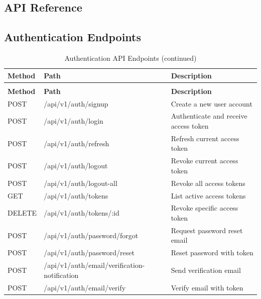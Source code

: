 \documentclass[12pt,a4paper,oneside]{report}
\begin{document}
\begin{appendix}
\clearpage
\chapter{API Reference}
\label{app:api}

\section{Authentication Endpoints}
\begin{longtable}{lll}
\caption{Authentication API Endpoints} \\

\textbf{Method} & \textbf{Path} & \textbf{Description} \\

\endfirsthead
\caption*{Authentication API Endpoints (continued)} \\

\textbf{Method} & \textbf{Path} & \textbf{Description} \\

\endhead

\endfoot

\endlastfoot
POST & /api/v1/auth/signup & Create a new user account \\
POST & /api/v1/auth/login & Authenticate and receive access token \\
POST & /api/v1/auth/refresh & Refresh current access token \\
POST & /api/v1/auth/logout & Revoke current access token \\
POST & /api/v1/auth/logout-all & Revoke all access tokens \\
GET & /api/v1/auth/tokens & List active access tokens \\
DELETE & /api/v1/auth/tokens/:id & Revoke specific access token \\
POST & /api/v1/auth/password/forgot & Request password reset email \\
POST & /api/v1/auth/password/reset & Reset password with token \\
POST & /api/v1/auth/email/verification-notification & Send verification email \\
POST & /api/v1/auth/email/verify & Verify email with token \\
\end{longtable}


\end{appendix}
\end{document}
